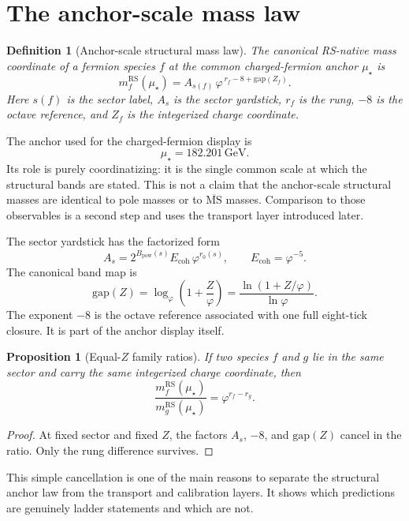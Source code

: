 \documentclass[11pt]{article}
\newtheorem{definition}{Definition}
\newtheorem{proposition}{Proposition}
\newcommand{\phig}{\varphi}
\newcommand{\mustar}{\mu_\star}
\newcommand{\Ecoh}{E_{\mathrm{coh}}}
\newcommand{\Bpow}{B_{\mathrm{pow}}}
\begin{document}
\section{The anchor-scale mass law}

\begin{definition}[Anchor-scale structural mass law]
The canonical RS-native mass coordinate of a fermion species \(f\) at the common charged-fermion anchor \(\mustar\) is
\[
  m_f^{\mathrm{RS}}(\mustar)
  = A_{s(f)}\,\phig^{\,r_f - 8 + \mathrm{gap}(Z_f)}.
\]
Here \(s(f)\) is the sector label, \(A_s\) is the sector yardstick, \(r_f\) is the rung, \(-8\) is the octave reference, and \(Z_f\) is the integerized charge coordinate.
\end{definition}

The anchor used for the charged-fermion display is
\[
  \mustar = 182.201\,\mathrm{GeV}.
\]
Its role is purely coordinatizing: it is the single common scale at which the structural bands are stated. This is not a claim that the anchor-scale structural masses are identical to pole masses or to \(\overline{\mathrm{MS}}\) masses. Comparison to those observables is a second step and uses the transport layer introduced later.

The sector yardstick has the factorized form
\[
  A_s = 2^{\Bpow(s)}\Ecoh\,\phig^{r_0(s)},
  \qquad
  \Ecoh = \phig^{-5}.
\]
The canonical band map is
\[
  \mathrm{gap}(Z)
  = \log_{\phig}\!\left(1+\frac{Z}{\phig}\right)
  = \frac{\ln\!\left(1+Z/\phig\right)}{\ln\phig}.
\]
The exponent \(-8\) is the octave reference associated with one full eight-tick closure. It is part of the anchor display itself.

\begin{proposition}[Equal-\(Z\) family ratios]
If two species \(f\) and \(g\) lie in the same sector and carry the same integerized charge coordinate, then
\[
  \frac{m_f^{\mathrm{RS}}(\mustar)}{m_g^{\mathrm{RS}}(\mustar)} = \phig^{r_f-r_g}.
\]
\end{proposition}

\begin{proof}
At fixed sector and fixed \(Z\), the factors \(A_s\), \(-8\), and \(\mathrm{gap}(Z)\) cancel in the ratio. Only the rung difference survives.
\end{proof}

This simple cancellation is one of the main reasons to separate the structural anchor law from the transport and calibration layers. It shows which predictions are genuinely ladder statements and which are not.
\end{document}

